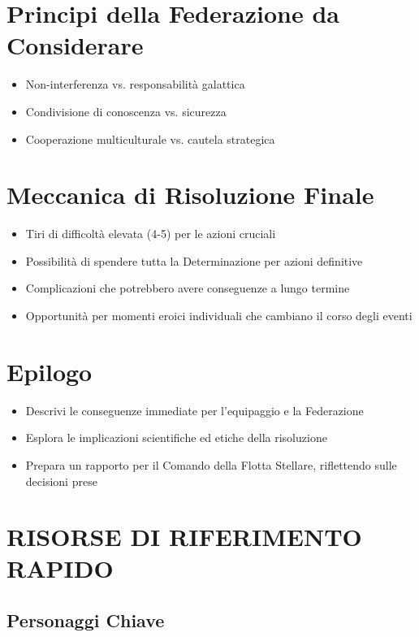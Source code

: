 \documentclass[letterpaper,twocolumn,openany,nodeprecatedcode]{dndbook}
\begin{document}
\section{Principi della Federazione da Considerare}

\begin{itemize}
    \item Non-interferenza vs. responsabilità galattica
    \item Condivisione di conoscenza vs. sicurezza
    \item Cooperazione multiculturale vs. cautela strategica
\end{itemize}

\section{Meccanica di Risoluzione Finale}

\begin{itemize}
    \item Tiri di difficoltà elevata (4-5) per le azioni cruciali
    \item Possibilità di spendere tutta la Determinazione per azioni definitive
    \item Complicazioni che potrebbero avere conseguenze a lungo termine
    \item Opportunità per momenti eroici individuali che cambiano il corso degli eventi
\end{itemize}

\section{Epilogo}

\begin{itemize}
    \item Descrivi le conseguenze immediate per l'equipaggio e la Federazione
    \item Esplora le implicazioni scientifiche ed etiche della risoluzione
    \item Prepara un rapporto per il Comando della Flotta Stellare, riflettendo sulle decisioni prese
\end{itemize}

\section{RISORSE DI RIFERIMENTO RAPIDO}
\subsection{Personaggi Chiave}
\end{document}
